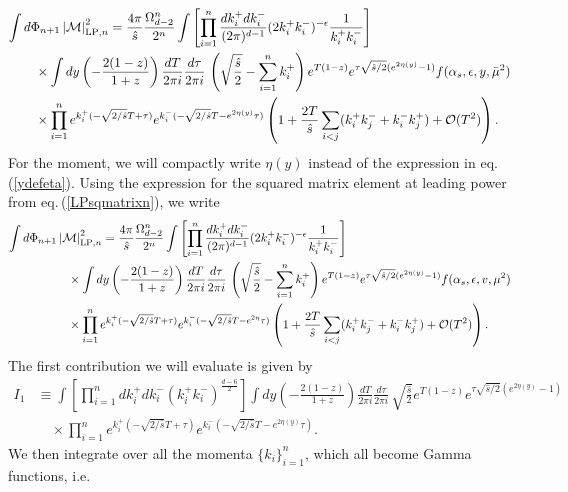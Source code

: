 \documentclass[11pt]{article}
\newcommand{\M}{\mathcal{M}}
\newcommand{\s}{\hat{s}}
\newcommand\eqn[1]     {eq.\,(\ref{#1})}
\begin{document}
\begin{align}
    \int d\Phi_{n+1}\left|\M\right|_{\text{LP},n}^2&=\frac{4\pi}{\s}\frac{\Omega_{d-2}^n}{2^n}\int\left[\prod_{i=1}^n\frac{dk_i^+dk_i^-}{(2\pi)^{d-1}}(2k_i^+k_i^-)^{-\epsilon} \frac{1}{k_i^+k_i^-}\right]\nonumber \\
    &\hspace{-2cm}\times \int dy \left(-\frac{2(1-z)}{1+z}\right)\frac{dT}{2\pi i} \frac{d\tau}{2\pi i}\, \left(\sqrt{\frac{\s}{2}}-\sum_{i=1}^n k_i^+\right)e^{T(1-z)}e^{\tau\sqrt{\s/2}(e^{2\eta(y)}-1)}f(\alpha_s,\epsilon,y,\bar\mu^2)\nonumber \\
    &\hspace{-2cm}\times \prod_{i=1}^n e^{k_i^+(-\sqrt{2/\s}T+\tau)}e^{k_i^-(-\sqrt{2/\s}T-e^{2\eta(y)}\tau)}\left(1+\frac{2T}{\s}\sum_{i<j}(k_i^+k_j^-+k_i^-k_j^+)+\mathcal{O}(T^2)\right).
\end{align}
For the moment, we will compactly write $\eta(y)$ instead of the expression in \eqn{ydefeta}. Using the expression for the squared matrix element at leading power from \eqn{LPsqmatrixn}, we write
\begin{align}
    \int d\Phi_{n+1}\left|\M\right|_{\text{LP},n}^2&=\frac{4\pi}{\s}\frac{\Omega_{d-2}^n}{2^n}\int\left[\prod_{i=1}^n\frac{dk_i^+dk_i^-}{(2\pi)^{d-1}}(2k_i^+k_i^-)^{-\epsilon} \frac{1}{k_i^+k_i^-}\right]\nonumber \\
    &\hspace{-1cm}\times \int dy \left(-\frac{2(1-z)}{1+z}\right)\frac{dT}{2\pi i} \frac{d\tau}{2\pi i}\, \left(\sqrt{\frac{\s}{2}}-\sum_{i=1}^n k_i^+\right)e^{T(1-z)}e^{\tau\sqrt{\s/2}(e^{2\eta(y)}-1)}f(\alpha_s,\epsilon,v,\mu^2)\nonumber \\
    &\hspace{-1cm}\times \prod_{i=1}^n e^{k_i^+(-\sqrt{2/\s}T+\tau)}e^{k_i^-(-\sqrt{2/\s}T-e^{2\eta}\tau)}\left(1+\frac{2T}{\s}\sum_{i<j}(k_i^+k_j^-+k_i^-k_j^+)+\mathcal{O}(T^2)\right).
\end{align}
The first contribution we will evaluate is given by
\begin{align}
  I_1&\equiv\int\left[\prod_{i=1}^n dk_i^+dk_i^-(k_i^+k_i^-)^{\frac{d-6}{2}}\right] \int dy \left(-\frac{2(1-z)}{1+z}\right)\frac{dT}{2\pi i} \frac{d\tau}{2\pi i}\, \sqrt{\frac{\s}{2}}e^{T(1-z)}e^{\tau\sqrt{\s/2}(e^{2\eta(y)}-1)}\nonumber \\
    &\quad\times \prod_{i=1}^n e^{k_i^+(-\sqrt{2/\s}T+\tau)}e^{k_i^-(-\sqrt{2/\s}T-e^{2\eta(y)}\tau)}.
\end{align}
We then integrate over all the momenta $\{k_i\}_{i=1}^n$, which all become Gamma functions, i.e.\ 
\end{document}
